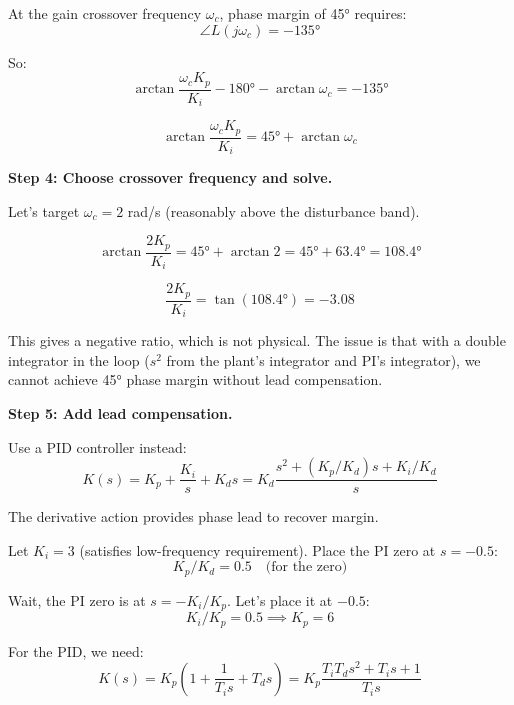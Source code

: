 \begin{example}
At the gain crossover frequency $\omega_c$, phase margin of 45° requires:
\begin{equation}
\angle L(j\omega_c) = -135°
\end{equation}

So:
\begin{equation}
\arctan\frac{\omega_c K_p}{K_i} - 180° - \arctan\omega_c = -135°
\end{equation}

\begin{equation}
\arctan\frac{\omega_c K_p}{K_i} = 45° + \arctan\omega_c
\end{equation}

\textbf{Step 4: Choose crossover frequency and solve.}

Let's target $\omega_c = 2$ rad/s (reasonably above the disturbance band).

\begin{equation}
\arctan\frac{2K_p}{K_i} = 45° + \arctan 2 = 45° + 63.4° = 108.4°
\end{equation}

\begin{equation}
\frac{2K_p}{K_i} = \tan(108.4°) = -3.08
\end{equation}

This gives a negative ratio, which is not physical. The issue is that with a double integrator in the loop ($s^2$ from the plant's integrator and PI's integrator), we cannot achieve 45° phase margin without lead compensation.

\textbf{Step 5: Add lead compensation.}

Use a PID controller instead:
\begin{equation}
K(s) = K_p + \frac{K_i}{s} + K_d s = K_d \frac{s^2 + (K_p/K_d)s + K_i/K_d}{s}
\end{equation}

The derivative action provides phase lead to recover margin.

Let $K_i = 3$ (satisfies low-frequency requirement). Place the PI zero at $s = -0.5$:
\begin{equation}
K_p/K_d = 0.5 \quad \text{(for the zero)}
\end{equation}

Wait, the PI zero is at $s = -K_i/K_p$. Let's place it at $-0.5$:
\begin{equation}
K_i/K_p = 0.5 \implies K_p = 6
\end{equation}

For the PID, we need:
\begin{equation}
K(s) = K_p\left(1 + \frac{1}{T_i s} + T_d s\right) = K_p \frac{T_i T_d s^2 + T_i s + 1}{T_i s}
\end{equation}


\end{example}

